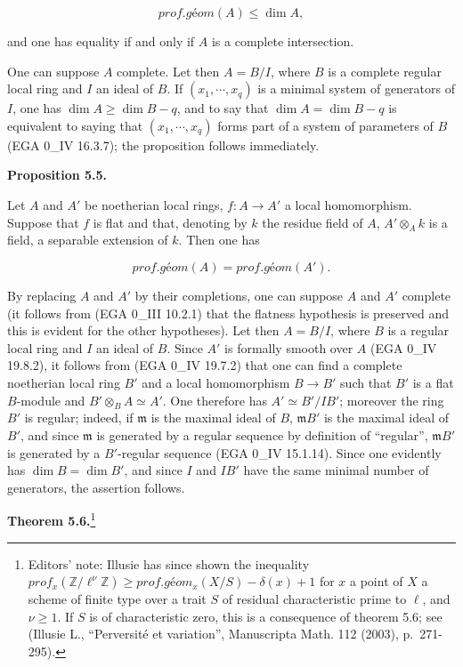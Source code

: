 \documentclass[
]{article}
\begin{document}
\[
prof.géom(A) \leqslant \dim A,
\]

and one has equality if and only if \(A\) is a complete intersection.

One can suppose \(A\) complete. Let then \(A = B/I\), where \(B\) is a
complete regular local ring and \(I\) an ideal of \(B\). If
\((x_{1}, \cdots, x_{q})\) is a minimal system of generators of \(I\),
one has \(\dim A \geqslant \dim B - q\), and to say that
\(\dim A = \dim B - q\) is equivalent to saying that
\((x_{1}, \cdots, x_{q})\) forms part of a system of parameters of \(B\)
(EGA 0\_IV 16.3.7); the proposition follows immediately.

\textbf{Proposition 5.5.}

Let \(A\) and \(A'\) be noetherian local rings, \(f : A \to A'\) a local
homomorphism. Suppose that \(f\) is flat and that, denoting by \(k\) the
residue field of \(A\), \(A' \otimes_{A} k\) is a field, a separable
extension of \(k\). Then one has

\[
prof.géom(A) = prof.géom(A').
\]

By replacing \(A\) and \(A'\) by their completions, one can suppose
\(A\) and \(A'\) complete (it follows from (EGA 0\_III 10.2.1) that the
flatness hypothesis is preserved and this is evident for the other
hypotheses). Let then \(A = B/I\), where \(B\) is a regular local ring
and \(I\) an ideal of \(B\). Since \(A'\) is formally smooth over \(A\)
(EGA 0\_IV 19.8.2), it follows from (EGA 0\_IV 19.7.2) that one can find
a complete noetherian local ring \(B'\) and a local homomorphism
\(B \to B'\) such that \(B'\) is a flat \(B\)-module and
\(B' \otimes_{B} A \simeq A'\). One therefore has \(A' \simeq B'/IB'\);
moreover the ring \(B'\) is regular; indeed, if \(\mathfrak{m}\) is the
maximal ideal of \(B\), \(\mathfrak{m} B'\) is the maximal ideal of
\(B'\), and since \(\mathfrak{m}\) is generated by a regular sequence by
definition of ``regular'', \(\mathfrak{m} B'\) is generated by a
\(B'\)-regular sequence (EGA 0\_IV 15.1.14). Since one evidently has
\(\dim B = \dim B'\), and since \(I\) and \(IB'\) have the same minimal
number of generators, the assertion follows.

\textbf{Theorem 5.6.}\footnote{Editors' note: Illusie has since shown
  the inequality
  \(prof_{x}(\mathbb{Z}/\ell^{\nu} \mathbb{Z}) \geqslant prof.géom_{x}(X/S) - \delta(x) + 1\)
  for \(x\) a point of \(X\) a scheme of finite type over a trait \(S\)
  of residual characteristic prime to \(\ell\), and \(\nu \geqslant 1\).
  If \(S\) is of characteristic zero, this is a consequence of theorem
  5.6; see (Illusie L., ``Perversité et variation'', Manuscripta Math.
  112 (2003), p.~271-295).}
\end{document}
